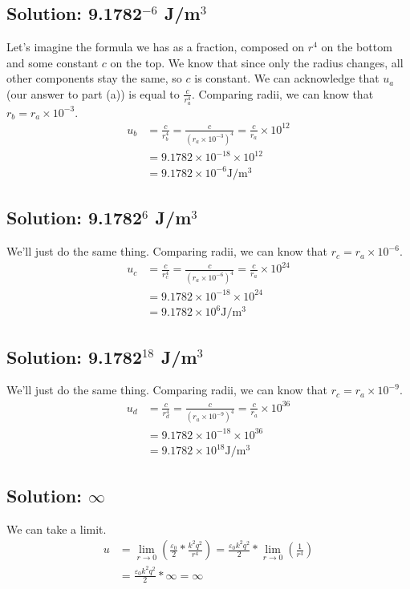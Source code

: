 \documentclass[12pt]{article}
\begin{document}
\subsection{Solution: 9.1782$^{-6}$ J/m$^3$}
Let's imagine the formula we has as a fraction, composed on $r^4$ on the bottom and some constant $c$ on the top. 
We know that since only the radius changes, all other components stay the same, so $c$ is constant.
We can acknowledge that $u_a$ (our answer to part (a)) is equal to $\frac{c}{r_a^4}$.
Comparing radii, we can know that $r_b = r_a \times 10^{-3}$.
\begin{align*}
    u_b &=  \frac{c}{r_b^4}
        =   \frac{c}{(r_a \times 10^{-3})^4}
        =   \frac{c}{r_a} \times 10^{12}\\
        &=  9.1782 \times 10^{-18} \times 10^{12}\\
        &=  \boxed{9.1782 \times 10^{-6} \unit{\joule/\meter^3}}
\end{align*}

\subsection{Solution: 9.1782$^{6}$ J/m$^3$}
We'll just do the same thing. 
Comparing radii, we can know that $r_c = r_a \times 10^{-6}$.
\begin{align*}
    u_c &=  \frac{c}{r_c^4}
        =   \frac{c}{(r_a \times 10^{-6})^4}
        =   \frac{c}{r_a} \times 10^{24}\\
        &=  9.1782 \times 10^{-18} \times 10^{24}\\
        &=  \boxed{9.1782 \times 10^{6} \unit{\joule/\meter^3}}
\end{align*}

\subsection{Solution: 9.1782$^{18}$ J/m$^3$}
We'll just do the same thing. 
Comparing radii, we can know that $r_c = r_a \times 10^{-9}$.
\begin{align*}
    u_d &=  \frac{c}{r_d^4}
        =   \frac{c}{(r_a \times 10^{-9})^4}
        =   \frac{c}{r_a} \times 10^{36}\\
        &=  9.1782 \times 10^{-18} \times 10^{36}\\
        &=  \boxed{9.1782 \times 10^{18} \unit{\joule/\meter^3}}
\end{align*}

\subsection{Solution: $\infty$}
We can take a limit.
\begin{align*}
    u   &=  \underset{r\to 0}{\lim}\left( \frac{\varepsilon_0}{2}*\frac{k^2q^2}{r^4} \right)
        =   \frac{\varepsilon_0k^2q^2}{2}*\underset{r\to 0}{\lim}\left( \frac{1}{r^4} \right)\\
        &=  \frac{\varepsilon_0k^2q^2}{2}*\infty
        =   \boxed{\infty}
\end{align*}
\end{document}
